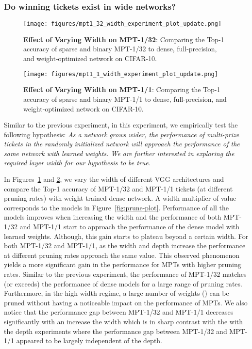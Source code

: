\documentclass{article} \usepackage{iclr2021_conference,times}
\begin{document}
\subsubsection{Do winning tickets exist in wide networks?} \label{sec:exp-wide}
\begin{figure}[!t]
    \centering
    \texttt{[image: figures/mpt1\_32\_width\_experiment\_plot\_update.png]}
    \caption{{\bfseries Effect of Varying Width on MPT-1/32}: Comparing the Top-1 accuracy of sparse and binary MPT-1/32 to dense, full-precision, and weight-optimized network on CIFAR-10.}
    \label{fig:mpt1-32-plot}
\end{figure}
\begin{figure}[h]
    \centering
    \texttt{[image: figures/mpt1\_1\_width\_experiment\_plot\_update.png]}
    \caption{{\bfseries Effect of Varying Width on MPT-1/1}: Comparing the Top-1 accuracy of sparse and binary MPT-1/1 to dense, full-precision, and weight-optimized network on CIFAR-10.}
    \label{fig:mpt1-1-plot}
\end{figure}
Similar to the previous experiment, in this experiment, we empirically test the following hypothesis: \emph{As a network grows wider, the performance of multi-prize tickets in the randomly initialized network will approach the performance of the same network with learned weights. We are further interested in exploring the required layer width for our hypothesis to be true.}


In Figures~\ref{fig:mpt1-32-plot} and \ref{fig:mpt1-1-plot}, we vary the width of different VGG architectures and compare the Top-1 accuracy of MPT-1/32 and MPT-1/1 tickets (at different pruning rates) with weight-trained dense network. A width multiplier of value  corresponds to the models in Figure~\ref{fig:prune-plot}. Performance of all the models improves when increasing the width   
and the performance of both MPT-1/32 and MPT-1/1 start to approach the performance of the dense model with learned weights. Although, this gain starts to plateau beyond a certain width. For both MPT-1/32 and MPT-1/1, as the width and depth increase the performance at different pruning rates approach the same value. This observed phenomenon yields a more significant gain in the performance for MPTs with higher pruning rates. 
Similar to the previous experiment, the performance of MPT-1/32 matches (or exceeds) the performance of dense models for a large range of pruning rates. Furthermore, in the high width regime, a large number of weights () can be pruned without having a noticeable impact on the performance of MPTs. We also notice that the performance gap between MPT-1/32 and MPT-1/1 decreases significantly with an increase the width which is in sharp contrast with the with the depth experiments where the performance gap between MPT-1/32 and MPT-1/1 appeared to be largely independent of the depth.
\end{document}
